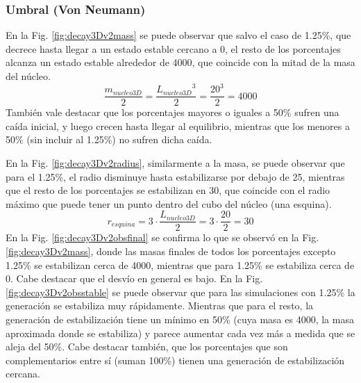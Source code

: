 \subsubsection{Umbral (Von Neumann)}
En la Fig. \ref{fig:decay3Dv2mass} se puede observar que salvo el caso de 1.25\%, que decrece hasta llegar a un estado estable cercano a 0, el resto de los porcentajes alcanza un estado estable alrededor de 4000, que coincide con la mitad de la masa del núcleo.
\begin{equation}
    \frac{m_{nucleo3D}}{2} = \frac{{L_{nucleo3D}}^3}{2} = \frac{20^3}{2} = 4000
\end{equation}
También vale destacar que los porcentajes mayores o iguales a 50\% sufren una caída inicial, y luego crecen hasta llegar al equilibrio, mientras que los menores a 50\% (sin incluir al 1.25\%) no sufren dicha caída.


En la Fig. \ref{fig:decay3Dv2radius}, similarmente a la masa, se puede observar que para el 1.25\%, el radio disminuye hasta estabilizarse por debajo de 25, mientras que el resto de los porcentajes se estabilizan en 30, que coincide con el radio máximo que puede tener un punto dentro del cubo del núcleo (una esquina).
\begin{equation}
    r_{esquina} = 3 \cdot \frac{L_{nucleo3D}}{2} = 3 \cdot \frac{20}{2} = 30
\end{equation}
En la Fig. \ref{fig:decay3Dv2obsfinal} se confirma lo que se observó en la Fig. \ref{fig:decay3Dv2mass}, donde las masas finales de todos los porcentajes excepto 1.25\% se estabilizan cerca de 4000, mientras que para 1.25\% se estabiliza cerca de 0. Cabe destacar que el desvío en general es bajo.
En la Fig. \ref{fig:decay3Dv2obsstable} se puede observar que para las simulaciones con 1.25\% la generación se estabiliza muy rápidamente. Mientras que para el resto, la generación de estabilización tiene un mínimo en 50\% (cuya masa es 4000, la masa aproximada donde se estabiliza) y parece aumentar cada vez más a medida que se aleja del 50\%. Cabe destacar también, que los porcentajes que son complementarios entre sí (suman 100\%) tienen una generación de estabilización cercana.